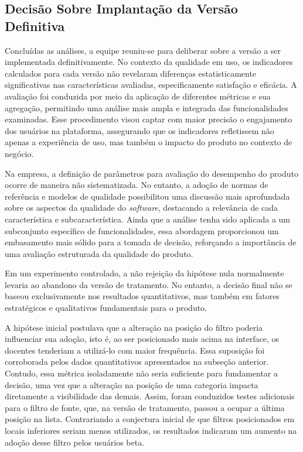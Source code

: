 \subsection{Decisão Sobre Implantação da Versão Definitiva}

Concluídas as análises, a equipe reuniu-se para deliberar sobre a versão a ser implementada definitivamente. No contexto da qualidade em uso, os indicadores calculados para cada versão não revelaram diferenças estatisticamente significativas nas características avaliadas, especificamente satisfação e eficácia. A avaliação foi conduzida por meio da aplicação de diferentes métricas e sua agregação, permitindo uma análise mais ampla e integrada das funcionalidades examinadas. Esse procedimento visou captar com maior precisão o engajamento dos usuários na plataforma, assegurando que os indicadores refletissem não apenas a experiência de uso, mas também o impacto do produto no contexto de negócio.  

Na empresa, a definição de parâmetros para avaliação do desempenho do produto ocorre de maneira não sistematizada. No entanto, a adoção de normas de referência e modelos de qualidade possibilitou uma discussão mais aprofundada sobre os aspectos da qualidade do \textit{software}, destacando a relevância de cada característica e subcaracterística. Ainda que a análise tenha sido aplicada a um subconjunto específico de funcionalidades, essa abordagem proporcionou um embasamento mais sólido para a tomada de decisão, reforçando a importância de uma avaliação estruturada da qualidade do produto.  

Em um experimento controlado, a não rejeição da hipótese nula normalmente levaria ao abandono da versão de tratamento. No entanto, a decisão final não se baseou exclusivamente nos resultados quantitativos, mas também em fatores estratégicos e qualitativos fundamentais para o produto.  

A hipótese inicial postulava que a alteração na posição do filtro poderia influenciar sua adoção, isto é, ao ser posicionado mais acima na interface, os docentes tenderiam a utilizá-lo com maior frequência. Essa suposição foi corroborada pelos dados quantitativos apresentados na subseção anterior. Contudo, essa métrica isoladamente não seria suficiente para fundamentar a decisão, uma vez que a alteração na posição de uma categoria impacta diretamente a visibilidade das demais. Assim, foram conduzidos testes adicionais para o filtro de fonte, que, na versão de tratamento, passou a ocupar a última posição na lista. Contrariando a conjectura inicial de que filtros posicionados em locais inferiores seriam menos utilizados, os resultados indicaram um aumento na adoção desse filtro pelos usuários beta.  

